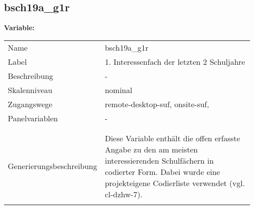 	
	
	\subsection{bsch19a\_g1r}
	\label{subSection:bsch19a_g1r}

	\noindent\textbf{Variable:}\\
		\begin{tabular}{lL{11.3cm}}
			\label{tableVariable:bsch19a_g1r}
			Name & bsch19a\_g1r \\
			Label & 1. Interessenfach der letzten 2 Schuljahre  \\
			Beschreibung & - \\
			Skalenniveau & nominal \\
			Zugangswege &
				remote-desktop-suf,
				onsite-suf,
 \\
			Panelvariablen & -
			 \\
			 \\
 \\
					Generierungsbeschreibung & Diese Variable enthält die offen erfasste Angabe zu den am meisten interessierenden Schulfächern in codierter Form. Dabei wurde eine projekteigene Codierliste verwendet (vgl. cl-dzhw-7).
				 \\	
			 \\
		\end{tabular}






